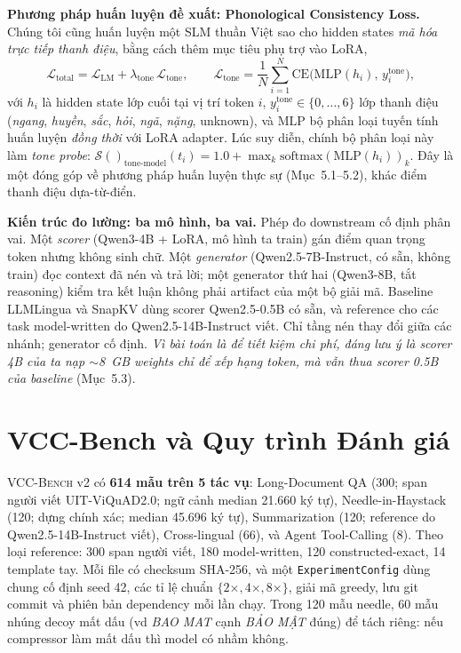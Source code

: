 \documentclass[runningheads]{llncs}
\newcommand{\tone}[1]{\textit{#1}}
\newcommand{\score}[1]{\mathcal{S}(#1)}
\newcommand{\method}[1]{\textsc{#1}}
\newcommand{\viet}[1]{\textit{#1}}
\begin{document}
\textbf{Phương pháp huấn luyện đề xuất: Phonological Consistency Loss.} Chúng tôi cũng huấn luyện một SLM thuần Việt sao cho hidden states \emph{mã hóa trực tiếp thanh điệu}, bằng cách thêm mục tiêu phụ trợ vào LoRA,
\begin{equation}
\mathcal{L}_{\text{total}} = \mathcal{L}_{\text{LM}} + \lambda_{\text{tone}}\,\mathcal{L}_{\text{tone}}, \qquad
\mathcal{L}_{\text{tone}} = \frac1N\sum_{i=1}^{N} \text{CE}\big(\text{MLP}(h_i),\, y_i^{\text{tone}}\big),
\label{eq:phon}
\end{equation}
với $h_i$ là hidden state lớp cuối tại vị trí token $i$, $y_i^{\text{tone}}\in\{0,\ldots,6\}$ lớp thanh điệu (\tone{ngang}, \tone{huyền}, \tone{sắc}, \tone{hỏi}, \tone{ngã}, \tone{nặng}, unknown), và $\text{MLP}$ bộ phân loại tuyến tính huấn luyện \emph{đồng thời} với LoRA adapter. Lúc suy diễn, chính bộ phân loại này làm \emph{tone probe}: $\score{}_{\text{tone-model}}(t_i) = 1.0 + \max_k \text{softmax}(\text{MLP}(h_i))_k$. Đây là một đóng góp về phương pháp huấn luyện thực sự (Mục~5.1--5.2), khác điểm thanh điệu dựa-từ-điển.

\textbf{Kiến trúc đo lường: ba mô hình, ba vai.} Phép đo downstream cố định phân vai. Một \emph{scorer} (Qwen3-4B + LoRA, mô hình ta train) gán điểm quan trọng token nhưng không sinh chữ. Một \emph{generator} (Qwen2.5-7B-Instruct, có sẵn, không train) đọc context đã nén và trả lời; một generator thứ hai (Qwen3-8B, tắt reasoning) kiểm tra kết luận không phải artifact của một bộ giải mã. Baseline LLMLingua và SnapKV dùng scorer Qwen2.5-0.5B có sẵn, và reference cho các task model-written do Qwen2.5-14B-Instruct viết. Chỉ tầng nén thay đổi giữa các nhánh; generator cố định. \emph{Vì bài toán là để tiết kiệm chi phí, đáng lưu ý là scorer 4B của ta nạp $\sim$8~GB weights chỉ để xếp hạng token, mà vẫn thua scorer 0.5B của baseline} (Mục~5.3).


\section{VCC-Bench và Quy trình Đánh giá}

\method{VCC-Bench} v2 có \textbf{614 mẫu trên 5 tác vụ}: Long-Document QA (300; span người viết UIT-ViQuAD2.0; ngữ cảnh median 21.660 ký tự), Needle-in-Haystack (120; dựng chính xác; median 45.696 ký tự), Summarization (120; reference do Qwen2.5-14B-Instruct viết), Cross-lingual (66), và Agent Tool-Calling (8). Theo loại reference: 300 span người viết, 180 model-written, 120 constructed-exact, 14 template tay. Mỗi file có checksum SHA-256, và một \texttt{ExperimentConfig} dùng chung cố định seed 42, các tỉ lệ chuẩn $\{2\times,4\times,8\times\}$, giải mã greedy, lưu git commit và phiên bản dependency mỗi lần chạy. Trong 120 mẫu needle, 60 mẫu nhúng decoy mất dấu (vd \viet{BAO MAT} cạnh \viet{BẢO MẬT} đúng) để tách riêng: nếu compressor làm mất dấu thì model có nhầm không.
\end{document}
